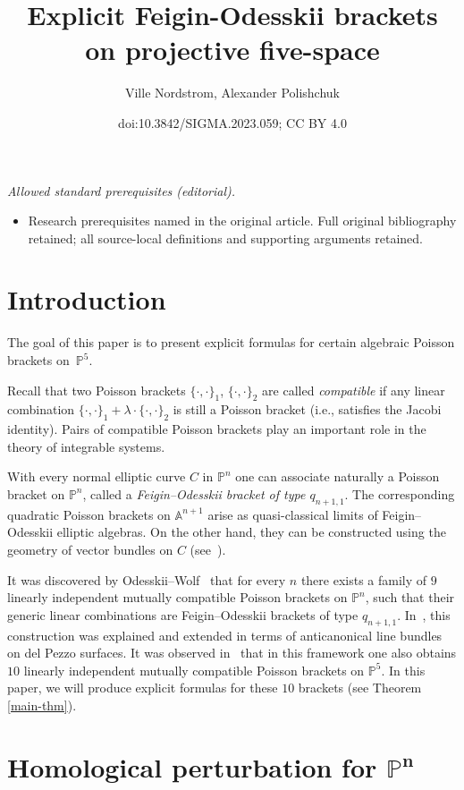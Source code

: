 \documentclass[10pt,a4paper]{amsart}
\title{Explicit Feigin-Odesskii brackets on projective five-space}
\author{Ville Nordstrom, Alexander Polishchuk}
\date{doi:10.3842/SIGMA.2023.059; CC BY 4.0}
\numberwithin{equation}{section}
\renewcommand{\P}{{\mathbb P}}
\newcommand{\A}{{\mathbb A}}
\newcommand{\la}{\lambda}
\begin{document}
\maketitle
\noindent\textit{Allowed standard prerequisites (editorial).}\begin{itemize}
\item Research prerequisites named in the original article. Full original bibliography retained; all source-local definitions and supporting arguments retained.
\end{itemize}\medskip
\section{Introduction}

The goal of this paper is to present explicit formulas for certain algebraic Poisson brackets on~$\P^5$.

Recall that two Poisson brackets $\{\cdot,\cdot\}_1$, $\{\cdot,\cdot\}_2$ are called {\it compatible} if any linear combination
$\{\cdot,\cdot\}_1+\la\cdot \{\cdot,\cdot\}_2$ is still a Poisson bracket (i.e., satisfies the Jacobi identity).
Pairs of compatible Poisson brackets play an important role in the theory of integrable systems.

With every normal elliptic curve $C$ in $\P^n$ one can associate naturally a Poisson bracket on $\P^n$, called a {\it Feigin--Odesskii bracket
of type $q_{n+1,1}$}. The corresponding quadratic Poisson brackets on $\A^{n+1}$ arise as quasi-classical limits of Feigin--Odesskii elliptic algebras.
On the other hand, they can be constructed using the geometry of vector bundles on $C$ (see~\cite{FO95, P98}).

It was discovered by Odesskii--Wolf~\cite{OW} that for every $n$ there exists a family of $9$ linearly independent mutually compatible Poisson brackets on $\P^n$,
such that their generic linear combinations are Feigin--Odesskii brackets of type $q_{n+1,1}$. In~\cite{HP}, this construction was explained and extended in terms of anticanonical
line bundles on del Pezzo surfaces. It was observed in~\cite[Example~4.6]{HP} that in this framework one also obtains $10$ linearly independent mutually compatible
Poisson brackets on $\P^5$. In this paper, we will produce explicit formulas for these $10$ brackets (see Theorem \ref{main-thm}).

\section[Homological perturbation for P\^{}n]{Homological perturbation for $\boldsymbol{\P^n}$}
\end{document}

